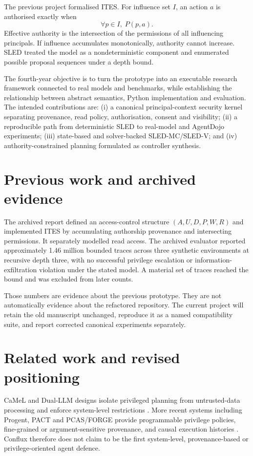 \documentclass[11pt]{article}
\begin{document}
The previous project formalised ITES. For influence set $I$, an action $a$ is authorised exactly when
\[
  \forall p \in I,\;P(p,a).
\]
Effective authority is the intersection of the permissions of all influencing principals. If influence accumulates monotonically, authority cannot increase. SLED treated the model as a nondeterministic component and enumerated possible proposal sequences under a depth bound.

The fourth-year objective is to turn the prototype into an executable research framework connected to real models and benchmarks, while establishing the relationship between abstract semantics, Python implementation and evaluation. The intended contributions are: (i) a canonical principal-context security kernel separating provenance, read policy, authorisation, consent and visibility; (ii) a reproducible path from deterministic SLED to real-model and AgentDojo experiments; (iii) state-based and solver-backed SLED-MC/SLED-V; and (iv) authority-constrained planning formulated as controller synthesis.

\section{Previous work and archived evidence}
The archived report defined an access-control structure $(A,U,D,P,W,R)$ and implemented ITES by accumulating authorship provenance and intersecting permissions. It separately modelled read access. The archived evaluator reported approximately 1.46 million bounded traces across three synthetic environments at recursive depth three, with no successful privilege escalation or information-exfiltration violation under the stated model. A material set of traces reached the bound and was excluded from later counts.

Those numbers are evidence about the previous prototype. They are not automatically evidence about the refactored repository. The current project will retain the old manuscript unchanged, reproduce it as a named compatibility suite, and report corrected canonical experiments separately.

\section{Related work and revised positioning}
CaMeL and Dual-LLM designs isolate privileged planning from untrusted-data processing and enforce system-level restrictions \citep{camel,designpatterns}. More recent systems including Progent, PACT and PCAS/FORGE provide programmable privilege policies, fine-grained or argument-sensitive provenance, and causal execution histories \citep{progent,pact,forge}. Conflux therefore does not claim to be the first system-level, provenance-based or privilege-oriented agent defence.
\end{document}

